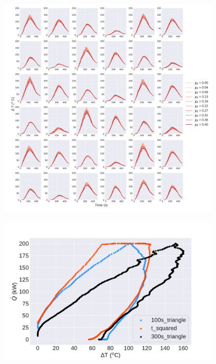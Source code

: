 \documentclass{article}
\begin{document}
\begin{figure}[htb] \centering
\includegraphics[width=.75\textwidth]{./figures/constant_Qtot_assumption.pdf}
\caption{}
\label{fig:constant_Qtot_assumption}
\end{figure}

\begin{figure}[htb] \centering
\includegraphics[width=.75\textwidth]{./figures/temp_scatter.pdf}
\caption{}
\label{fig:temp_scatter}
\end{figure}
\end{document}

